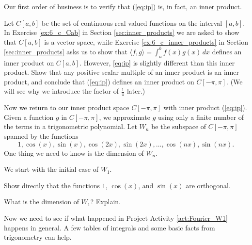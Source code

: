 Our first order of business is to verify that (\ref{eq:ip}) is, in fact, an inner product. 

\begin{pactivity} \label{act:Fourier_inner_product} Let $C[a,b]$ be the set of continuous real-valued functions on the interval $[a,b]$. In Exercise \ref{ex:6_c_Cab} in Section \ref{sec:inner_products} we are asked to show that $C[a,b]$ is a vector space, while Exercise \ref{ex:6_c_inner_products} in Section \ref{sec:inner_products} asks us to show that $\langle f,g \rangle = \int_a^b f(x)g(x) \, dx$ defines an inner product on $C[a,b]$. However, \ref{eq:ip} is slightly different than this inner product. Show that any positive scalar multiple of an inner product is an inner product, and conclude that (\ref{eq:ip}) defines an inner product on $C[-\pi,\pi]$. (We will see why we introduce the factor of $\frac{1}{\pi}$ later.)


\end{pactivity}

Now we return to our inner product space $C[-\pi,\pi]$ with inner product (\ref{eq:ip}). Given a function $g$ in $C[-\pi,\pi]$, we approximate $g$ using only a finite number of the terms in a trigonometric polynomial. Let $W_n$ be the subspace of $C[-\pi,\pi]$ spanned by the functions
\[1, \cos(x), \sin(x), \cos(2x), \sin(2x), \ldots, \cos(nx), \sin(nx).\]
One thing we need to know is the dimension of $W_n$.

\label{ex:W1}

\begin{pactivity} \label{act:Fourier_W1} We start with the initial case of $W_1$.
	\ba
	\item Show directly that the functions $1$, $\cos(x)$, and $\sin(x)$ are orthogonal.


	\item What is the dimension of $W_1$? Explain.
	
	\ea

\end{pactivity}

Now we need to see if what happened in Project Activity \ref{act:Fourier_W1}  happens in general. A few tables of integrals and some basic facts from trigonometry can help.

